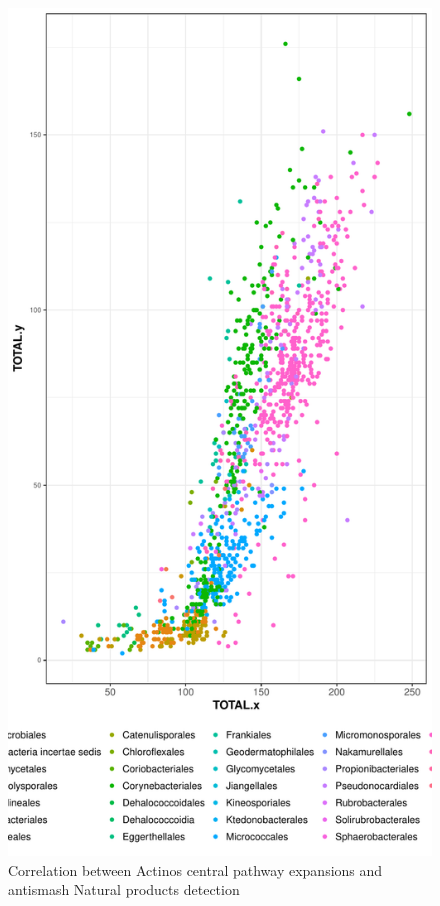 \documentclass[12pt,twoside]{reedthesis}
\begin{document}
  \begin{figure}[h!tbp]
  \centering
  \includegraphics[angle = 0,scale = 0.5]{chapter4/ActinosSMASHvsExpansionsbyOrder.pdf}
  \caption[Correlation between Actinos central pathway expansions and antismash Natural products detection]{\normalsize{Correlation between Actinos central pathway expansions and antismash Natural products detection}}
  \label{fig:ActinosSMASHvsExpansionsbyOrder}
  \end{figure}
  
\end{document}
